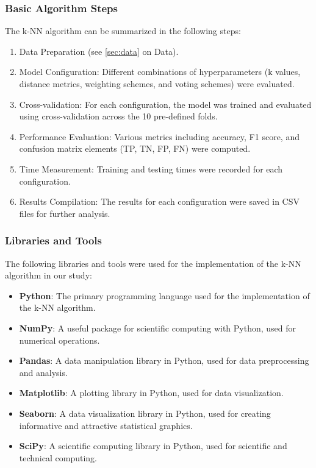 \subsubsection*{Basic Algorithm Steps}
The k-NN algorithm can be summarized in the following steps:
\begin{enumerate}
    \item Data Preparation (see \autoref{sec:data} on Data).
    \item Model Configuration: Different combinations of hyperparameters (k values, distance metrics, weighting schemes, and voting schemes) were evaluated.
    \item Cross-validation: For each configuration, the model was trained and evaluated using cross-validation across the 10 pre-defined folds.
    \item Performance Evaluation: Various metrics including accuracy, F1 score, and confusion matrix elements (TP, TN, FP, FN) were computed.
    \item Time Measurement: Training and testing times were recorded for each configuration.
    \item Results Compilation: The results for each configuration were saved in CSV files for further analysis.
\end{enumerate}

\subsubsection*{Libraries and Tools}
The following libraries and tools were used for the implementation of the k-NN algorithm in our study:

\begin{itemize}
    \item \textbf{Python}: The primary programming language used for the implementation of the k-NN algorithm.
    \item \textbf{NumPy}: A useful package for scientific computing with Python, used for numerical operations.
    \item \textbf{Pandas}: A data manipulation library in Python, used for data preprocessing and analysis.
    \item \textbf{Matplotlib}: A plotting library in Python, used for data visualization.
    \item \textbf{Seaborn}: A data visualization library in Python, used for creating informative and attractive statistical graphics.
    \item \textbf{SciPy}: A scientific computing library in Python, used for scientific and technical computing.
\end{itemize}

